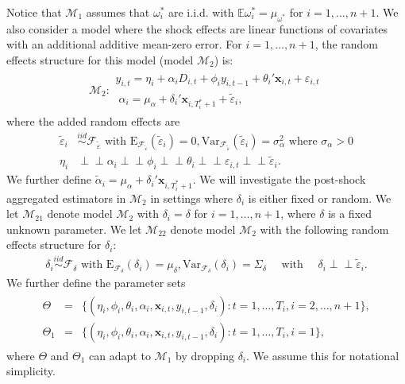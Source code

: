 \documentclass[11pt]{article}
\def\mbf#1{\mathbf{#1}} %
\newcommand{\simiid}{\stackrel{iid}{\sim}} %
\def\where{\text{ where }} %
\newcommand{\indep}{\perp \!\!\! \perp } %
\def\mrm#1{\mathrm{#1}} %
\def\t#1{\tilde{#1}} %
\def\mc#1{\mathcal{#1}} %
\def\E{\mathbb{E}} %
\def\mc#1{\mathcal{#1}}
\theoremstyle{definition}
\begin{document}
Notice that $\mc{M}_1$ assumes that $\omega^{*}_i$ are i.i.d. with $\E{\omega^{*}_i}=\mu_{\omega^{*}}$ 
for $i = 1, \ldots, n+1$. We also consider a model where the shock effects are linear functions of covariates with an additional additive mean-zero error. For $i = 1, \ldots, n+1$, the random effects structure for this model (model $\mc{M}_2$) is:
\begin{align}
\mc{M}_2 \colon \begin{array}{l}
  y_{i,t} =\eta_i +\alpha_i D_{i,t} + \phi_i y_{i, t-1} + \theta_i'\mbf{x}_{i,t} + \varepsilon_{i,t}\\[.2cm]
  \; \alpha_i = \mu_{\alpha}+\delta_{i}'\mbf{x}_{i, T_i^*+1}+ \t{\varepsilon}_{i},
\end{array}\label{model2}
\end{align}
 where the added random effects are
\begin{align*}
\t{\varepsilon}_{i} &\simiid  \mc{F}_{\t{\varepsilon}} \text{ with }\mrm{E}_{\mc{F}_{\t{\varepsilon}}}(\t{\varepsilon}_{i})=0, \mrm{Var}_{\mc{F}_{\t{\varepsilon}}}(\t{\varepsilon}_{i})=\sigma^2_{\alpha} \where \sigma_{\alpha}>0\\
\eta_i &\indep  \alpha_i \indep \phi_i \indep \theta_i \indep \varepsilon_{i,t} \indep \t{\varepsilon}_{i}.
\end{align*} 
We further define 
$\tilde{\alpha}_i=\mu_{\alpha}+\delta_i'\mbf{x}_{i, T_i^*+1}$. 
We will investigate the post-shock aggregated estimators in $\mc{M}_2$ 
in settings where $\delta_i$ is either fixed or random. 
We let $\mc{M}_{21}$ denote model $\mc{M}_{2}$ with $\delta_i = \delta$ for $i= 1, \ldots, n+1$, 
where $\delta$ is a  fixed unknown parameter.
We let $\mc{M}_{22}$ denote model $\mc{M}_{2}$ with the following random effects 
structure for $\delta_i$:
\begin{align*}
\delta_i\simiid  \mc{F}_{\delta} \text{ with }\mrm{E}_{\mc{F}_{\delta}}(\delta_i)=\mu_{\delta}, \mrm{Var}_{\mc{F}_{\delta}}(\delta_i)=\Sigma_\delta 
   \quad \text{ with } \quad  \delta_i  \indep \t{\varepsilon}_{i}.
\end{align*}
We further define the parameter sets
\begin{align}
  \begin{array}{lll}
     \Theta &= &\{(\eta_i, \phi_i, \theta_i, \alpha_i, \mbf{x}_{i,t}, y_{i,t-1}, \delta_i)\colon t= 1, \ldots, T_i, i = 2, \ldots, n +1\},\\
    \Theta_1 &= &\{(\eta_i, \phi_i, \theta_i, \alpha_i, \mbf{x}_{i,t}, y_{i,t-1}, \delta_i)\colon t= 1, \ldots, T_i, i = 1\},\label{parameter}
  \end{array}
\end{align}
where $\Theta$ and $\Theta_1$ can adapt to $\mc{M}_1$ by dropping $\delta_i$. We assume this for notational simplicity.
\end{document}

